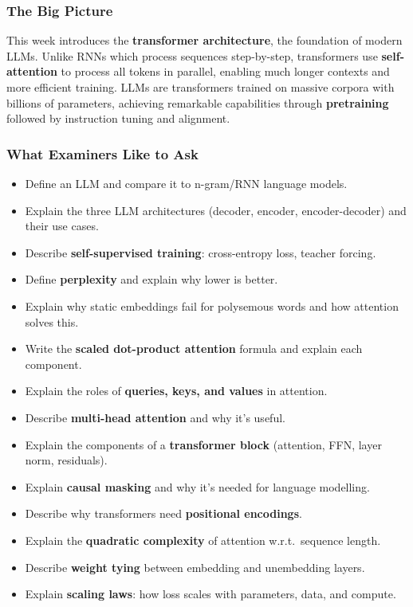 \separator

\subsubsection*{The Big Picture}

This week introduces the \textbf{transformer architecture}, the foundation of modern LLMs. Unlike RNNs which process sequences step-by-step, transformers use \textbf{self-attention} to process all tokens in parallel, enabling much longer contexts and more efficient training. LLMs are transformers trained on massive corpora with billions of parameters, achieving remarkable capabilities through \textbf{pretraining} followed by instruction tuning and alignment.

\separator

\subsubsection*{What Examiners Like to Ask}

\begin{itemize}
  \item Define an LLM and compare it to n-gram/RNN language models.
  \item Explain the three LLM architectures (decoder, encoder, encoder-decoder) and their use cases.
  \item Describe \textbf{self-supervised training}: cross-entropy loss, teacher forcing.
  \item Define \textbf{perplexity} and explain why lower is better.
  \item Explain why static embeddings fail for polysemous words and how attention solves this.
  \item Write the \textbf{scaled dot-product attention} formula and explain each component.
  \item Explain the roles of \textbf{queries, keys, and values} in attention.
  \item Describe \textbf{multi-head attention} and why it's useful.
  \item Explain the components of a \textbf{transformer block} (attention, FFN, layer norm, residuals).
  \item Explain \textbf{causal masking} and why it's needed for language modelling.
  \item Describe why transformers need \textbf{positional encodings}.
  \item Explain the \textbf{quadratic complexity} of attention w.r.t.\ sequence length.
  \item Describe \textbf{weight tying} between embedding and unembedding layers.
  \item Explain \textbf{scaling laws}: how loss scales with parameters, data, and compute.
\end{itemize}

